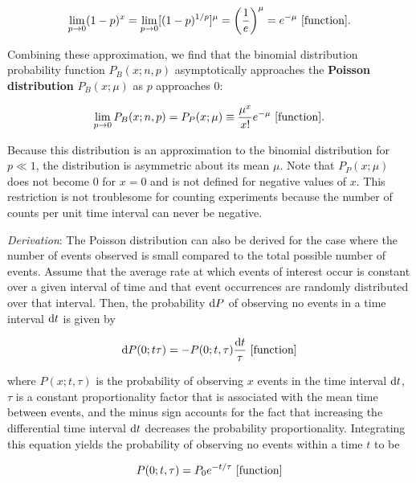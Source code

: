 \documentclass[a4paper,10pt]{article}
\begin{document}
\begin{align*}
    \lim_{p\rightarrow0}(1-p)^x = \lim_{p\rightarrow0} [(1-p)^{1/p}]^\mu = \left(\frac{1}{e}\right)^\mu = e^{-\mu} ~ [{\rm function}].
\end{align*}

{\noindent}Combining these approximation, we find that the binomial distribution probability function $P_B(x;n,p)$ asymptotically approaches the \textbf{Poisson distribution} $P_B(x;\mu)$ as $p$ approaches $0$:

\begin{align*}
    \lim_{p\rightarrow0}P_B(x;n,p) = P_P(x;\mu) \equiv \frac{\mu^x}{x!}e^{-\mu} ~ [{\rm function}].
\end{align*}

{\noindent}Because this distribution is an approximation to the binomial distribution for $p\ll1$, the distribution is asymmetric about its mean $\mu$. Note that $P_P(x;\mu)$ does not become $0$ for $x=0$ and is not defined for negative values of $x$. This restriction is not troublesome for counting experiments because the number of counts per unit time interval can never be negative.

{\noindent}\textit{Derivation}: The Poisson distribution can also be derived for the case where the number of events observed is small compared to the total possible number of events. Assume that the average rate at which events of interest occur is constant over a given interval of time and that event occurrences are randomly distributed over that interval. Then, the probability ${\rm d}P$ of observing no events in a time interval ${\rm d}t$ is given by

\begin{align*}
    {\rm d}P(0;t\tau) = -P(0;t,\tau)\frac{{\rm d}t}{\tau} ~ [{\rm function}]
\end{align*}

{\noindent}where $P(x;t,\tau)$ is the probability of observing $x$ events in the time interval ${\rm d}t$, $\tau$ is a constant proportionality factor that is associated with the mean time between events, and the minus sign accounts for the fact that increasing the differential time interval ${\rm d}t$ decreases the probability proportionality. Integrating this equation yields the probability of observing no events within a time $t$ to be

\begin{align*}
    P(0;t,\tau) = P_0e^{-t/\tau} ~ [{\rm function}]
\end{align*}
\end{document}
